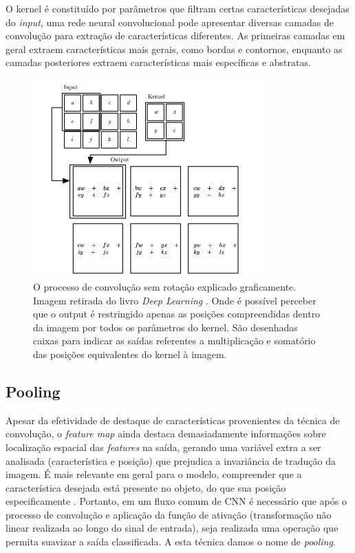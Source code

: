 \documentclass[12pt]{article}
\begin{document}
O kernel é constituído por parâmetros que filtram certas características desejadas do {\it input}, uma rede neural convolucional pode apresentar diversas camadas de convolução para extração de características diferentes. As primeiras camadas em geral extraem características mais gerais, como bordas e contornos, enquanto as camadas posteriores extraem características mais específicas e abstratas.


\begin{figure}[ht]
  \centering
  \includegraphics[width=0.8\textwidth]{images/convolution.png}
  \caption{O processo de convolução sem rotação explicado graficamente. Imagem retirada do livro {\it Deep Learning} \cite{Goodfellow-et-al-2016}. Onde é possível perceber que o output é restringido apenas as posições compreendidas dentro da imagem por todos os parâmetros do kernel. São desenhadas caixas para indicar as saídas referentes a multiplicação e somatório das posições equivalentes do kernel à imagem.}
  \label{fig:convolution}
\end{figure}


\subsection{Pooling}

Apesar da efetividade de destaque de características provenientes da técnica de convolução, o {\it feature map} ainda destaca demasiadamente informações sobre localização espacial das {\it features} na saída, gerando uma variável extra a ser analisada (característica e posição) que prejudica a invariância de tradução da imagem. É mais relevante em geral para o modelo, compreender que a característica desejada está presente no objeto, do que sua posição especificamente \cite{Goodfellow-et-al-2016}. Portanto, em um fluxo comum de CNN é necessário que após o processo de convolução e aplicação da função de ativação (transformação não linear realizada ao longo do sinal de entrada), seja realizada uma operação que permita suavizar a saída classificada. A esta técnica damos o nome de {\it pooling}.
\end{document}
